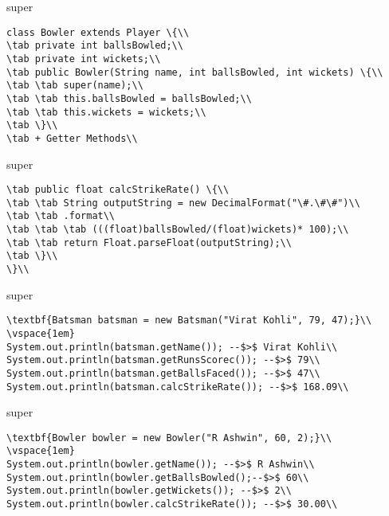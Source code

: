 \documentclass[aspectratio=169,14pt,usenames,dvipsnames]{beamer}
\newcommand\tab[1][1cm]{\hspace*{#1}}
\begin{document}
\begin{frame}{super}
\begin{lstlisting}
class Bowler extends Player \{\\
\tab private int ballsBowled;\\
\tab private int wickets;\\
\tab public Bowler(String name, int ballsBowled, int wickets) \{\\
\tab \tab super(name);\\
\tab \tab this.ballsBowled = ballsBowled;\\
\tab \tab this.wickets = wickets;\\
\tab \}\\
\tab + Getter Methods\\
\end{lstlisting}
\end{frame}



\begin{frame}{super}
\begin{lstlisting}
\tab public float calcStrikeRate() \{\\
\tab \tab String outputString = new DecimalFormat("\#.\#\#")\\
\tab \tab .format\\
\tab \tab \tab (((float)ballsBowled/(float)wickets)* 100);\\
\tab \tab return Float.parseFloat(outputString);\\
\tab \}\\
\}\\
\end{lstlisting}
\end{frame}

\begin{frame}{super}
\begin{lstlisting}
\textbf{Batsman batsman = new Batsman("Virat Kohli", 79, 47);}\\
\vspace{1em}
System.out.println(batsman.getName()); --$>$ Virat Kohli\\
System.out.println(batsman.getRunsScorec()); --$>$ 79\\
System.out.println(batsman.getBallsFaced()); --$>$ 47\\
System.out.println(batsman.calcStrikeRate()); --$>$ 168.09\\
\end{lstlisting}
\end{frame}

\begin{frame}{super}
\begin{lstlisting}
\textbf{Bowler bowler = new Bowler("R Ashwin", 60, 2);}\\
\vspace{1em}
System.out.println(bowler.getName()); --$>$ R Ashwin\\
System.out.println(bowler.getBallsBowled();--$>$ 60\\
System.out.println(bowler.getWickets()); --$>$ 2\\
System.out.println(bowler.calcStrikeRate()); --$>$ 30.00\\
\end{lstlisting}
\end{frame}
\end{document}
